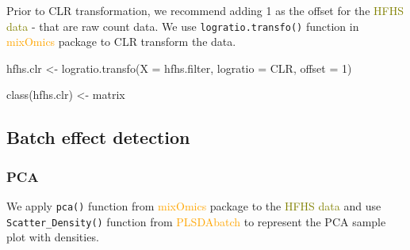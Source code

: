 \documentclass[
]{book}
\newenvironment{Shaded}{\begin{snugshade}}{\end{snugshade}}
\newcommand{\AttributeTok}[1]{\textcolor[rgb]{0.77,0.63,0.00}{#1}}
\newcommand{\DecValTok}[1]{\textcolor[rgb]{0.00,0.00,0.81}{#1}}
\newcommand{\FunctionTok}[1]{\textcolor[rgb]{0.00,0.00,0.00}{#1}}
\newcommand{\NormalTok}[1]{#1}
\newcommand{\OtherTok}[1]{\textcolor[rgb]{0.56,0.35,0.01}{#1}}
\newcommand{\StringTok}[1]{\textcolor[rgb]{0.31,0.60,0.02}{#1}}
\begin{document}
Prior to CLR transformation, we recommend adding 1 as the offset for the \textcolor{olive}{HFHS data} - that are raw count data. We use \texttt{logratio.transfo()} function in \textcolor{orange}{mixOmics} package to CLR transform the data.

\begin{Shaded}
\begin{Highlighting}[]
\NormalTok{hfhs.clr }\OtherTok{\textless{}{-}} \FunctionTok{logratio.transfo}\NormalTok{(}\AttributeTok{X =}\NormalTok{ hfhs.filter, }\AttributeTok{logratio =} \StringTok{\textquotesingle{}CLR\textquotesingle{}}\NormalTok{, }\AttributeTok{offset =} \DecValTok{1}\NormalTok{)}

\FunctionTok{class}\NormalTok{(hfhs.clr) }\OtherTok{\textless{}{-}} \StringTok{\textquotesingle{}matrix\textquotesingle{}}
\end{Highlighting}
\end{Shaded}

\hypertarget{batch-effect-detection-2}{%
\subsection{Batch effect detection}\label{batch-effect-detection-2}}

\hypertarget{pca-2}{%
\subsubsection{PCA}\label{pca-2}}

We apply \texttt{pca()} function from \textcolor{orange}{mixOmics} package to the \textcolor{olive}{HFHS data} and use \texttt{Scatter\_Density()} function from \textcolor{orange}{PLSDAbatch} to represent the PCA sample plot with densities.
\end{document}
